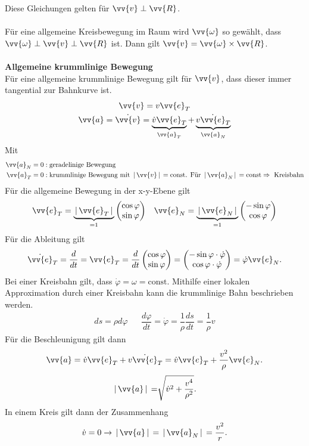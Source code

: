 \documentclass[a4paper,12pt]{article}
\begin{document}
Diese Gleichungen gelten für $\vv{v}\perp \vv{R}$.\\\\
Für eine allgemeine Kreisbewegung im Raum wird $\vv{\omega }$ so gewählt, dass $\vv{\omega } \perp \vv{v} \perp \vv{R}$ ist. Dann gilt $\vv{v}=\vv{\omega }\times \vv{R}$.
\\\hfill\\\textbf{Allgemeine krummlinige Bewegung}\\
Für eine allgemeine krummlinige Bewegung gilt für $\vv{v}$, dass dieser immer tangential zur Bahnkurve ist. 
\begin{gather*}
        \vv{v}=v \vv{e}_T\\
        \vv{a}=\dot{\vv{v}}=\underbrace{\dot{v}\vv{e}_T}_{\vv{a}_T}+\underbrace{v \dot{\vv{e}}_T}_{\vv{a}_N}
\end{gather*}
Mit 
\begin{align*}
        \vv{a}_N=0&:\text{geradelinige Bewegung}\\
        \vv{a}_T=0&:\text{krummlinige Bewegung mit }\,|\, \vv{v}\,|\, =\text{const}\text{. Für }\,|\, \vv{a}_N\,|\, =\text{const}\Rightarrow \text{ Kreisbahn}
\end{align*}
Für die allgemeine Bewegung in der x-y-Ebene gilt
\begin{align*}
        \vv{e}_T=\underbrace{\,|\, \vv{e}_T\,|\,}_{=1} \left(\begin{matrix}
                \cos \varphi \\
                \sin \varphi 
        \end{matrix}\right)&&\vv{e}_N=\underbrace{\,|\, \vv{e}_N\,|\,}_{=1} \left(\begin{matrix}
                -\sin \varphi \\
                \cos \varphi 
        \end{matrix}\right)
\end{align*}
Für die Ableitung gilt
\[ 
        \dot{\vv{e}}_T=\dfrac{d}{dt}=\vv{e}_T=\dfrac{d}{dt}\left(\begin{matrix}
                \cos \varphi \\
                \sin \varphi 
        \end{matrix}\right)=\left(\begin{matrix}
                -\sin \varphi \cdot \dot{\varphi }\\
                \cos \varphi \cdot \dot{\varphi }
        \end{matrix}\right)=\dot{\varphi }\vv{e}_N
.\] 
Bei einer Kreisbahn gilt, dass $\dot{\varphi }=\omega =\text{const}$. Mithilfe einer lokalen Approximation durch einer Kreisbahn kann die krummlinige Bahn beschrieben werden.
\begin{align*}
        ds=\rho d\varphi &&\dfrac{d\varphi }{dt}=\dot{\varphi} =\dfrac{1}{\rho }\dfrac{ds}{dt}=\dfrac{1}{\rho }v
\end{align*}
Für die Beschleunigung gilt dann
\[ 
        \vv{a}=\dot{v}\vv{e}_T+v\dot{\vv{e}}_T=\dot{v}\vv{e}_T+\dfrac{v^2}{\rho }\vv{e}_N
.\] 
\[
        \,|\, \vv{a}\,|\, =\sqrt[]{\dot{v}^2+\dfrac{v^{4}}{\rho ^{2} }}
.\]
In einem Kreis gilt dann der Zusammenhang
\[ 
        \dot{v}=0\rightarrow \,|\, \vv{a}\,|\, =\,|\, \vv{a}_N\,|\, =\dfrac{v^2}{r}
.\] 
\end{document}
